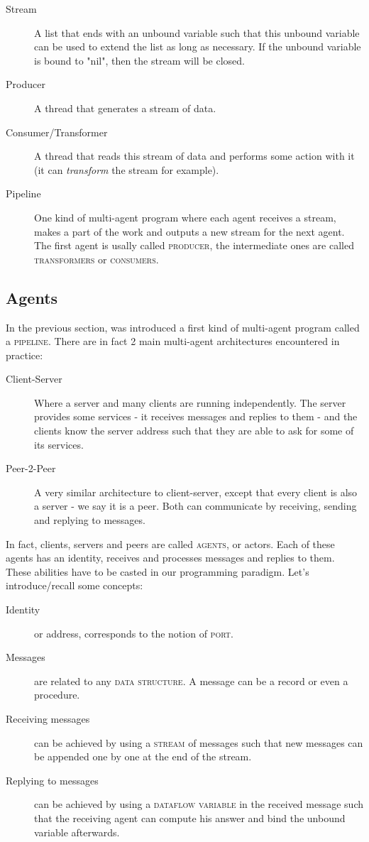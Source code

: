 \documentclass[11pt,a4paper,twoside,openright]{report}
\begin{document}
\begin{description}
 \item[Stream] A list that ends with an unbound variable such that this unbound 
variable can be used to extend the list as long as necessary. If the unbound 
variable is bound to "nil", then 	the stream will be closed.
 \item[Producer] A thread that generates a stream of data.
 \item[Consumer/Transformer] A thread that reads this stream of data and 
performs some action with it (it can \textit{transform} the stream for example).
 \item[Pipeline] One kind of multi-agent program where each agent receives a 
stream, makes a part of the work and outputs a new stream for the next agent. 
The first agent is usally called \textsc{producer}, the intermediate ones are 
called \textsc{transformers} or \textsc{consumers}. 
\end{description}


\subsection{Agents}
In the previous section, was introduced a first kind of multi-agent program 
called a \textsc{pipeline}. There are in fact 2 main multi-agent architectures 
encountered in practice:

\begin{description} 
	\item[Client-Server] Where a server and many clients are running 
independently. The server provides some services - it receives messages and 
replies to them - and the clients know the server address such that they are 
able to ask for some of its services.
	\item[Peer-2-Peer] A very similar architecture to client-server, except 
that every client is also a server - we say it is a peer. Both can communicate 
by receiving, sending and replying to messages.
\end{description}

In fact, clients, servers and peers are called \textsc{agents}, or actors. Each 
of these agents has an identity, receives and processes messages and replies to 
them. These abilities have to be casted in our programming paradigm. Let's 
introduce/recall some concepts:

\begin{description}
	\item[Identity] or address, corresponds to the notion of \textsc{port}.
	\item[Messages] are related to any \textsc{data structure}. A message 
can be a record or even a procedure.
	\item[Receiving messages] can be achieved by using a \textsc{stream} of 
messages such that new messages can be appended one by one at the end of the 
stream.
	\item[Replying to messages] can be achieved by using a \textsc{dataflow 
variable} in the received message such that the receiving agent can compute his 
answer and bind the unbound variable afterwards.
\end{description}
\end{document}
